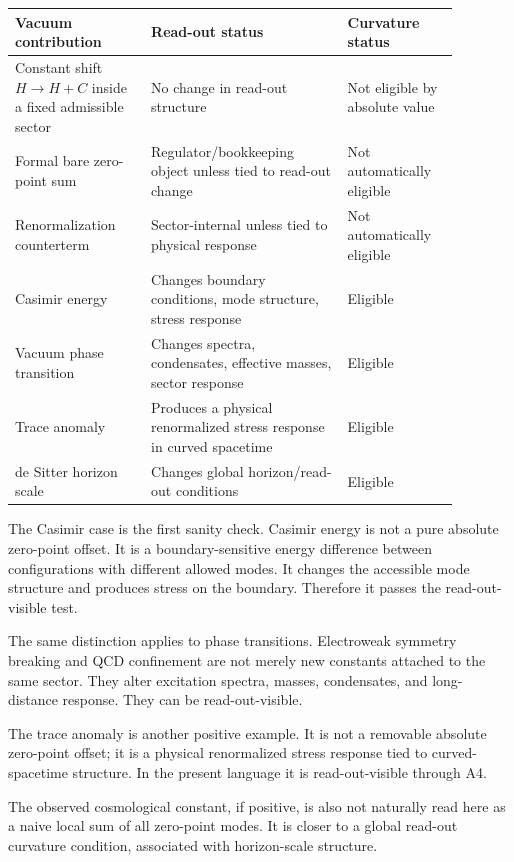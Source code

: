 \documentclass[12pt,a4paper]{article}
\theoremstyle{definition}
\theoremstyle{remark}
\begin{document}
\begin{center}
\begin{tabular}{P{0.27\linewidth}P{0.39\linewidth}P{0.22\linewidth}}
\toprule
\textbf{Vacuum contribution} & \textbf{Read-out status} & \textbf{Curvature status} \\
\midrule
Constant shift $H\to H+C$ inside a fixed admissible sector & No change in read-out structure & Not eligible by absolute value \\
Formal bare zero-point sum & Regulator/bookkeeping object unless tied to read-out change & Not automatically eligible \\
Renormalization counterterm & Sector-internal unless tied to physical response & Not automatically eligible \\
Casimir energy & Changes boundary conditions, mode structure, stress response & Eligible \\
Vacuum phase transition & Changes spectra, condensates, effective masses, sector response & Eligible \\
Trace anomaly & Produces a physical renormalized stress response in curved spacetime & Eligible \\
de Sitter horizon scale & Changes global horizon/read-out conditions & Eligible \\
\bottomrule
\end{tabular}
\end{center}

The Casimir case is the first sanity check. Casimir energy is not a pure absolute zero-point offset. It is a boundary-sensitive energy difference between configurations with different allowed modes. It changes the accessible mode structure and produces stress on the boundary. Therefore it passes the read-out-visible test.

The same distinction applies to phase transitions. Electroweak symmetry breaking and QCD confinement are not merely new constants attached to the same sector. They alter excitation spectra, masses, condensates, and long-distance response. They can be read-out-visible.

The trace anomaly is another positive example. It is not a removable absolute zero-point offset; it is a physical renormalized stress response tied to curved-spacetime structure. In the present language it is read-out-visible through A4.

The observed cosmological constant, if positive, is also not naturally read here as a naive local sum of all zero-point modes. It is closer to a global read-out curvature condition, associated with horizon-scale structure.
\end{document}
